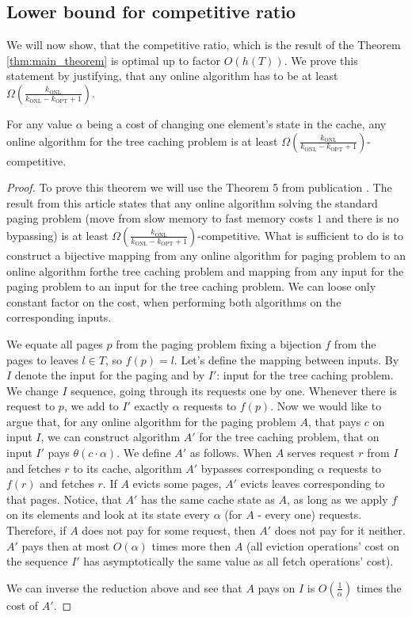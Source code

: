 \subsection{Lower bound for competitive ratio} We will now show, that the
competitive ratio, which is the result of the Theorem \ref{thm:main_theorem} is
optimal up to factor $O(h(T))$. We prove this statement by justifying, that any
online algorithm has to be at least $\Omega
(\frac{k_{\mathrm{ONL}}}{k_{\mathrm{ONL}}- k_{\mathrm{OPT}} + 1})$.
\begin{theorem} For any value $\alpha$ being a cost of changing one element's
state in the cache, any online algorithm for the tree caching problem is at
least $\Omega (\frac{k_{\mathrm{ONL}}}{k_{\mathrm{ONL}}- k_{\mathrm{OPT}} +
1})$-competitive.  \end{theorem} \begin{proof} To prove this theorem we will use
the Theorem 5 from publication \cite{tarjan}. The result from this article
states that any online algorithm solving the standard paging problem (move from
slow memory to fast memory costs $1$ and there is no bypassing) is at least
$\Omega(\frac{k_{\mathrm{ONL}}}{k_{\mathrm{ONL}}- k_{\mathrm{OPT}} +
1})$-competitive. What is sufficient to do is to construct a bijective mapping
from any online algorithm for paging problem to an online algorithm forthe tree
caching problem and mapping from any input for the paging problem to an input
for the tree caching problem. We can loose only constant factor on the cost,
when performing both algorithms on the corresponding inputs.

We equate all pages $p$ from the paging problem fixing a bijection $f$ from the
pages to leaves $l \in T$, so $f(p) = l$. Let's define the mapping between
inputs. By $I$ denote the input for the paging and by $I'$: input for the tree
caching problem. We change $I$ sequence, going through its requests one by one.
Whenever there is request to $p$, we add to $I'$ exactly $\alpha$ requests to
$f(p)$. Now we would like to argue that, for any online algorithm for the paging
problem $A$, that pays $c$ on input $I$, we can construct algorithm $A'$ for the
tree caching problem, that on input $I'$ pays $\theta(c \cdot \alpha)$. We
define $A'$ as follows.  When $A$ serves request $r$ from $I$ and fetches $r$ to
its cache, algorithm $A'$ bypasses corresponding $\alpha$ requests to $f(r)$ and
fetches $r$. If $A$ evicts some pages, $A'$ evicts leaves corresponding to that
pages. Notice, that $A'$ has the same cache state as $A$, as long as we apply
$f$ on its elements and look at its state every $\alpha$ (for $A$ - every one)
requests. Therefore, if $A$ does not pay for some request, then $A'$ does not
pay for it neither. $A'$ pays then at most $O(\alpha)$ times more then $A$ (all
eviction operations' cost on the sequence $I'$ has asymptotically the same value
as all fetch operations' cost).

We can inverse the reduction above and see that $A$ pays on $I$ is
$O(\frac{1}{\alpha})$ times the cost of $A'$.    \end{proof}
